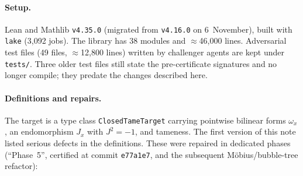 \documentclass[11pt]{article}
\renewcommand{\_}{\origus\allowbreak}
\newcommand{\code}[1]{\texttt{#1}}
\begin{document}
\paragraph{Setup.} Lean and Mathlib \code{v4.35.0} (migrated from \code{v4.16.0} on
6~November), built with \code{lake} (3{,}092 jobs). The library has 38 modules and
$\approx$46{,}000 lines. Adversarial test files (49 files, $\approx$12{,}800 lines) written by
challenger agents are kept under \code{tests/}. Three older test files still state the pre-certificate
signatures and no longer compile; they predate the changes described here.

\paragraph{Definitions and repairs.} The target is a type class \code{ClosedTameTarget} carrying
pointwise bilinear forms $\omega_x$, an endomorphism $J_x$ with $J^2=-1$, and tameness. The first
version of this note listed serious defects in the definitions. These were repaired in dedicated
phases (``Phase~5'', certified at commit \code{e77a1e7}, and the subsequent M\"obius/bubble-tree
refactor):
\end{document}
